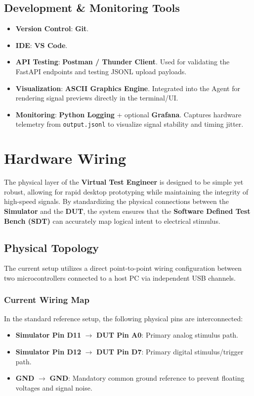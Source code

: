 \documentclass[conference]{IEEEtran}
\begin{document}
\subsection{Development \& Monitoring Tools}
\begin{itemize}
    \item \textbf{Version Control}: \textbf{Git}.
    \item \textbf{IDE}: \textbf{VS Code}.
    \item \textbf{API Testing}: \textbf{Postman / Thunder Client}. Used for validating the FastAPI endpoints and testing JSONL upload payloads.
    \item \textbf{Visualization}: \textbf{ASCII Graphics Engine}. Integrated into the Agent for rendering signal previews directly in the terminal/UI.
    \item \textbf{Monitoring}: \textbf{Python Logging} + optional \textbf{Grafana}. Captures hardware telemetry from \texttt{output.jsonl} to visualize signal stability and timing jitter.
\end{itemize}

\section{Hardware Wiring}
The physical layer of the \textbf{Virtual Test Engineer} is designed to be simple yet robust, allowing for rapid desktop prototyping while maintaining the integrity of high-speed signals. By standardizing the physical connections between the \textbf{Simulator} and the \textbf{DUT}, the system ensures that the \textbf{Software Defined Test Bench (SDT)} can accurately map logical intent to electrical stimulus.

\subsection{Physical Topology}
The current setup utilizes a direct point-to-point wiring configuration between two microcontrollers connected to a host PC via independent USB channels.

\subsubsection{Current Wiring Map}
In the standard reference setup, the following physical pins are interconnected:
\begin{itemize}
    \item \textbf{Simulator Pin D11} $\rightarrow$ \textbf{DUT Pin A0}: Primary analog stimulus path.
    \item \textbf{Simulator Pin D12} $\rightarrow$ \textbf{DUT Pin D7}: Primary digital stimulus/trigger path.
    \item \textbf{GND} $\rightarrow$ \textbf{GND}: Mandatory common ground reference to prevent floating voltages and signal noise.
\end{itemize}
\end{document}
